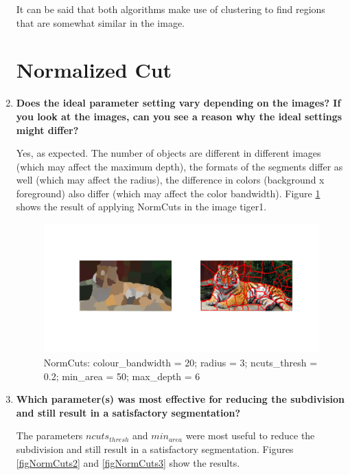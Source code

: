 \documentclass{article}
\begin{document}
\begin{enumerate}
    It can be said that both algorithms make use of clustering to find regions that are somewhat similar in the image.
    
\section{Normalized Cut}

    \item %
    \textbf{Does the ideal parameter setting vary depending on the images? If you look at the images, can you see a reason why the ideal settings might differ?}
    \par
    
    Yes, as expected. The number of objects are different in different images (which may affect the maximum depth), the formats of the segments differ as well (which may affect the radius), the difference in colors (background x foreground) also differ (which may affect the color bandwidth). Figure \ref{figNormCuts1} shows the result of applying NormCuts in the image tiger1.
    
    \begin{figure}[H]
        \centering
        \includegraphics[width=1.2\linewidth]{normcuts1.png}
        \caption{NormCuts: colour_{bandwidth} = 20; radius = 3; ncuts_{thresh} = 0.2; min_{area} = 50; max_{depth} = 6}
        \label{figNormCuts1}
    \end{figure}
    
    \item %
    \textbf{Which parameter(s) was most effective for reducing the subdivision and still result in a satisfactory segmentation?}
    \par
    
    The parameters $ncuts_{thresh}$ and $min_{area}$ were most useful to reduce the subdivision and still result in a satisfactory segmentation. Figures \ref{figNormCuts2} and \ref{figNormCuts3} show the results.
    

\end{enumerate}
\end{document}
